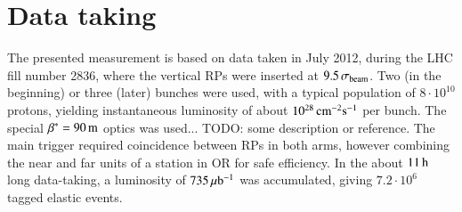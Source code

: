 \section{Data taking}

The presented measurement is based on data taken in July 2012, during the LHC fill number 2836, where the vertical
RPs were inserted at $9.5\,\sigma_{\rm beam}$. Two (in the beginning) or three (later) bunches were used, with
a typical population of $8\cdot10^{10}$ protons, yielding instantaneous luminosity of about $10^{28}\,{\rm cm^{-2}s^{-1}}$ per bunch. The special
$\beta^* = 90\,{\rm m}$ optics was used... TODO: some description or reference. The main trigger required coincidence between RPs in both arms,
however combining the near and far units of a station in OR for safe efficiency. In the about $11\,{\rm h}$ long
data-taking, a luminosity of $735\,{\rm \mu b^{-1}}$ was accumulated, giving
$7.2\cdot 10^6$ tagged elastic events.

